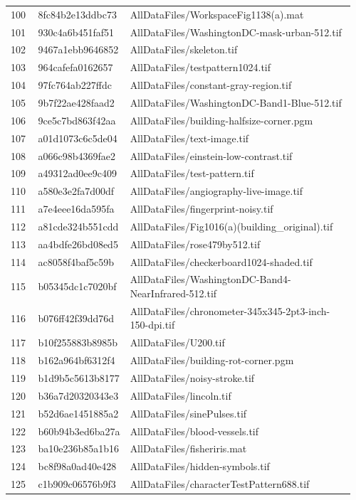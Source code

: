 \documentclass[11pt]{article}
\begin{document}
\begin{longtable}{p{0.08\linewidth}p{0.22\linewidth}p{0.66\linewidth}}
100 & 8fc84b2e13ddbc73 & AllDataFiles/WorkspaceFig1138(a).mat \\
101 & 930c4a6b451faf51 & AllDataFiles/WashingtonDC-mask-urban-512.tif \\
102 & 9467a1ebb9646852 & AllDataFiles/skeleton.tif \\
103 & 964cafefa0162657 & AllDataFiles/testpattern1024.tif \\
104 & 97fc764ab227ffdc & AllDataFiles/constant-gray-region.tif \\
105 & 9b7f22ae428faad2 & AllDataFiles/WashingtonDC-Band1-Blue-512.tif \\
106 & 9ce5c7bd863f42aa & AllDataFiles/building-halfsize-corner.pgm \\
107 & a01d1073c6c5de04 & AllDataFiles/text-image.tif \\
108 & a066c98b4369fae2 & AllDataFiles/einstein-low-contrast.tif \\
109 & a49312ad0ee9c409 & AllDataFiles/test-pattern.tif \\
110 & a580e3e2fa7d00df & AllDataFiles/angiography-live-image.tif \\
111 & a7e4eee16da595fa & AllDataFiles/fingerprint-noisy.tif \\
112 & a81cde324b551cdd & AllDataFiles/Fig1016(a)(building\_original).tif \\
113 & aa4bdfe26bd08ed5 & AllDataFiles/rose479by512.tif \\
114 & ac8058f4baf5c59b & AllDataFiles/checkerboard1024-shaded.tif \\
115 & b05345dc1c7020bf & AllDataFiles/WashingtonDC-Band4-NearInfrared-512.tif \\
116 & b076ff42f39dd76d & AllDataFiles/chronometer-345x345-2pt3-inch-150-dpi.tif \\
117 & b10f255883b8985b & AllDataFiles/U200.tif \\
118 & b162a964bf6312f4 & AllDataFiles/building-rot-corner.pgm \\
119 & b1d9b5c5613b8177 & AllDataFiles/noisy-stroke.tif \\
120 & b36a7d20320343e3 & AllDataFiles/lincoln.tif \\
121 & b52d6ae1451885a2 & AllDataFiles/sinePulses.tif \\
122 & b60b94b3ed6ba27a & AllDataFiles/blood-vessels.tif \\
123 & ba10e236b85a1b16 & AllDataFiles/fisheriris.mat \\
124 & bc8f98a0ad40e428 & AllDataFiles/hidden-symbols.tif \\
125 & c1b909c06576b9f3 & AllDataFiles/characterTestPattern688.tif \\

\end{longtable}
\end{document}
